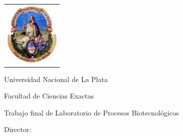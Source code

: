 \newcommand{\HRule}{\rule{\linewidth}{0.2mm}}
%
\thispagestyle{empty}

\begin{center}\leavevmode

\vspace{-2cm}

\begin{tabular}{l}
\includegraphics[width=2.6cm]{img/logo-unlp.jpeg}
\end{tabular}


{\large \sc Universidad Nacional de La Plata

Facultad de Ciencias Exactas
}

\vspace{3.0cm}


{\huge\bf \tituloTesis}

\vspace{2cm}
% 
{\large Trabajo final de Laboratorio de Procesos Biotecnológicos}

\vspace{2cm}

{\Large \autor}

\end{center}

\vfill

{\large

{Director: \director}

\vspace{.2cm}


\vspace{.2cm}

\lugar
}

\newpage\thispagestyle{empty}
